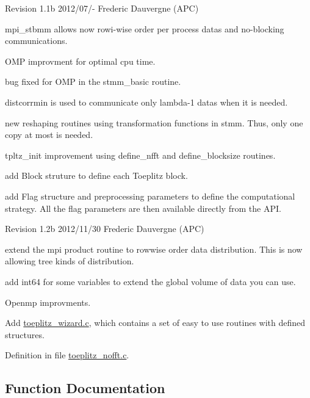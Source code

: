 Revision 1.\-1b 2012/07/-\/ Frederic Dauvergne (A\-P\-C)
\begin{DoxyItemize}
\item mpi\-\_\-stbmm allows now rowi-\/wise order per process datas and no-\/blocking communications.
\item O\-M\-P improvment for optimal cpu time.
\item bug fixed for O\-M\-P in the stmm\-\_\-basic routine.
\item distcorrmin is used to communicate only lambda-\/1 datas when it is needed.
\item new reshaping routines using transformation functions in stmm. Thus, only one copy at most is needed.
\item tpltz\-\_\-init improvement using define\-\_\-nfft and define\-\_\-blocksize routines.
\item add Block struture to define each Toeplitz block.
\item add Flag structure and preprocessing parameters to define the computational strategy. All the flag parameters are then available directly from the A\-P\-I.
\end{DoxyItemize}

Revision 1.\-2b 2012/11/30 Frederic Dauvergne (A\-P\-C)
\begin{DoxyItemize}
\item extend the mpi product routine to rowwise order data distribution. This is now allowing tree kinds of distribution.
\item add int64 for some variables to extend the global volume of data you can use.
\item Openmp improvments.
\item Add \hyperlink{toeplitz__wizard_8c}{toeplitz\-\_\-wizard.\-c}, which contains a set of easy to use routines with defined structures. 
\end{DoxyItemize}

Definition in file \hyperlink{toeplitz__nofft_8c_source}{toeplitz\-\_\-nofft.\-c}.



\subsection{Function Documentation}
